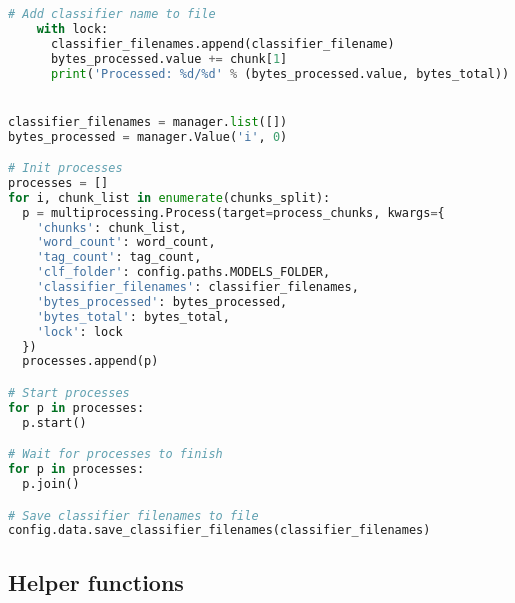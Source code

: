 \begin{lstlisting}[language=python]
    # Add classifier name to file
    with lock:
      classifier_filenames.append(classifier_filename)
      bytes_processed.value += chunk[1]
      print('Processed: %d/%d' % (bytes_processed.value, bytes_total))


classifier_filenames = manager.list([])
bytes_processed = manager.Value('i', 0)

# Init processes
processes = []
for i, chunk_list in enumerate(chunks_split):
  p = multiprocessing.Process(target=process_chunks, kwargs={
    'chunks': chunk_list,
    'word_count': word_count,
    'tag_count': tag_count,
    'clf_folder': config.paths.MODELS_FOLDER,
    'classifier_filenames': classifier_filenames,
    'bytes_processed': bytes_processed,
    'bytes_total': bytes_total,
    'lock': lock
  })
  processes.append(p)

# Start processes
for p in processes:
  p.start()

# Wait for processes to finish
for p in processes:
  p.join()

# Save classifier filenames to file
config.data.save_classifier_filenames(classifier_filenames)
\end{lstlisting}

\subsection{Helper functions}
\label{app:helper-functions}

